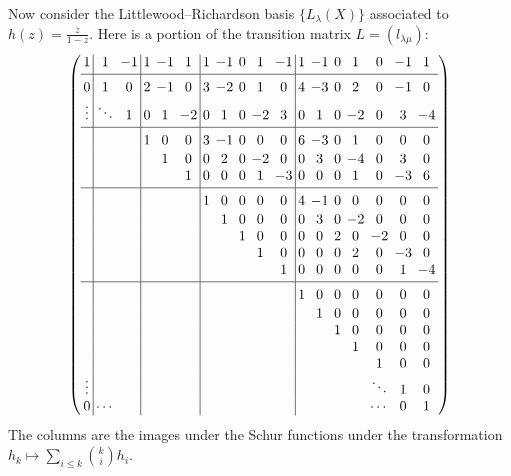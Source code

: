 \documentclass[12pt,dvips]{amsart}
\begin{document}
\bigskip
\noindent
Now consider the Littlewood--Richardson basis $\{L_\lambda(X)\}$ associated to $h(z)=\frac{z}{1-z}$. Here is a portion of the transition matrix $L = (l_{\lambda \mu})$:
\[
\left(
\setlength{\arraycolsep}{2pt}%
\def\str{{\vrule height12pt depth5pt width0pt}}%
\begin{array}{c|cc|ccc|ccccc|ccccccc}
 1 & 1 & -1 & 1 & -1 & 1 & 1 & -1 & 0 & 1 & -1   & 1 & -1 & 0 & 1 & 0 & -1 & 1 \\
[2pt]\hline\str
 0 & 1 & 0 & 2 & -1 & 0 & 3 & -2 & 0 & 1 & 0 &   4 & -3 & 0 & 2 & 0 & -1 & 0 \\
 \vdots & \ddots & 1 & 0 & 1 & -2 & 0 & 1 & 0 & -2 & 3 & 0   & 1 & 0 & -2 & 0 & 3 & -4 \\
[2pt]\hline\str
  &  &  & 1 & 0 & 0 & 3 & -1 & 0 & 0 & 0 & 6 &   -3 & 0 & 1 & 0 & 0 & 0 \\
  &  &  &  & 1 & 0 & 0 & 2 & 0 & -2 & 0 & 0 &   3 & 0 & -4 & 0 & 3 & 0 \\
  &  &  &  &  & 1 & 0 & 0 & 0 & 1 & -3 & 0 & 0   & 0 & 1 & 0 & -3 & 6 \\
[2pt]\hline\str
  &  &  &  &  &  & 1 & 0 & 0 & 0 & 0 & 4 & -1   & 0 & 0 & 0 & 0 & 0 \\
  &  &  &  &  &  &  & 1 & 0 & 0 & 0 & 0 & 3 &   0 & -2 & 0 & 0 & 0 \\
  &  &  &  &  &  &  &  & 1 & 0 & 0 & 0 & 0 & 2   & 0 & -2 & 0 & 0 \\
  &  &  &  &  &  &  &  &  & 1 & 0 & 0 & 0 & 0   & 2 & 0 & -3 & 0 \\
  &  &  &  &  &  &  &  &  &  & 1 & 0 & 0 & 0 &   0 & 0 & 1 & -4 \\
[2pt]\hline\str
  &  &  &  &  &  &  &  &  &  &  & 1 & 0 & 0 &   0 & 0 & 0 & 0 \\
  &  &  &  &  &  &  &  &  &  &  &  & 1 & 0 & 0   & 0 & 0 & 0 \\
  &  &  &  &  &  &  &  &  &  &  &  &  & 1 & 0   & 0 & 0 & 0 \\
  &  &  &  &  &  &  &  &  &  &  &  &  &  & 1 &   0 & 0 & 0 \\
  &  &  &  &  &  &  &  &  &  &  &  &  &  &  &   1 & 0 & 0 \\
 \vdots &  &  &  &  &  &  &  &  &  &  &  &  &  &  & \ddots  & 1 & 0 \\
 0 & \cdots &  &  &  &  &  &  &  &  &  &  &  &  &  & \cdots  & 0 & 1
\end{array}
\right)
\]
The columns are the images under the Schur functions under the transformation $h_k \mapsto \sum_{i \leq k} {k\choose i}   h_i$.
\end{document}
